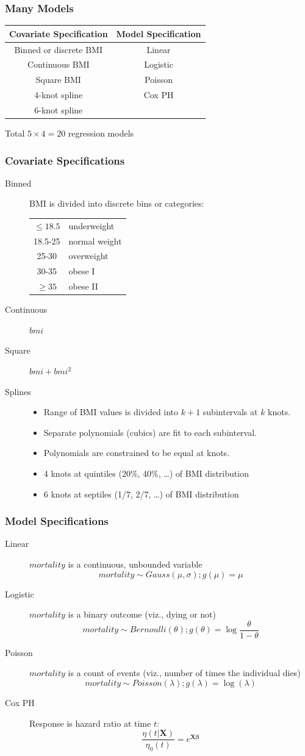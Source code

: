 \documentclass{philslides}
\begin{document}
\frame
{
	\frametitle{Many Models}
	\begin{center}
	\begin{tabular}{c|c}
	\textbf{Covariate Specification} & \textbf{Model Specification}\\
	\hline
	Binned or discrete BMI & Linear \\
	Continuous BMI & Logistic\\
	Square BMI & Poisson\\
	4-knot spline & Cox PH\\
	6-knot spline &\\
	\end{tabular}
	\end{center}
	Total $5 \times 4 = 20$ regression models
}
\frame
{
	\frametitle{Covariate Specifications}
	\begin{description}
	\item[Binned] BMI is divided into discrete bins or categories:  
		\begin{center}
		\small
		\begin{tabular}{cl}
		$\leq 18.5$ & underweight\\
		18.5-25 & normal weight\\
		25-30 & overweight\\
		30-35 & obese I\\
		$\geq 35$ & obese II
		\end{tabular}
		\end{center}
	\item[Continuous] $bmi$
	\item[Square] $bmi + bmi^2$
	\item[Splines] 
		\begin{itemize}
		\scriptsize
		\item Range of BMI values is divided into $k+1$ subintervals at $k$ knots.  
		\item Separate polynomials (cubics) are fit to each subinterval.  
		\item Polynomials are constrained to be equal at knots.  
		\item 4 knots at quintiles (20\%, 40\%, \ldots) of BMI distribution
		\item 6 knots at septiles (1/7, 2/7, \ldots) of BMI distribution
		\end{itemize}
	\end{description}
}
\frame
{
	\frametitle{Model Specifications}
	\begin{description}
	\item[Linear] $mortality$ is a continuous, unbounded variable
		\[mortality \sim Gauss(\mu, \sigma); g(\mu) = \mu\]
	\item[Logistic] $mortality$ is a binary outcome (viz., dying or not)
		\[mortality \sim Bernoulli(\theta); g(\theta) = \log \frac{\theta}{1-\theta}\]
	\item[Poisson] $mortality$ is a count of events (viz., number of times the individual dies)
		\[mortality \sim Poisson(\lambda); g(\lambda) = \log(\lambda)\]
	\item[Cox PH] Response is hazard ratio at time $t$: 
		\[\frac{\eta(t | \mathbf{X})}{\eta_0(t)} = e^{\mathbf{X\beta}} \]
	\end{description}
}
\end{document}
